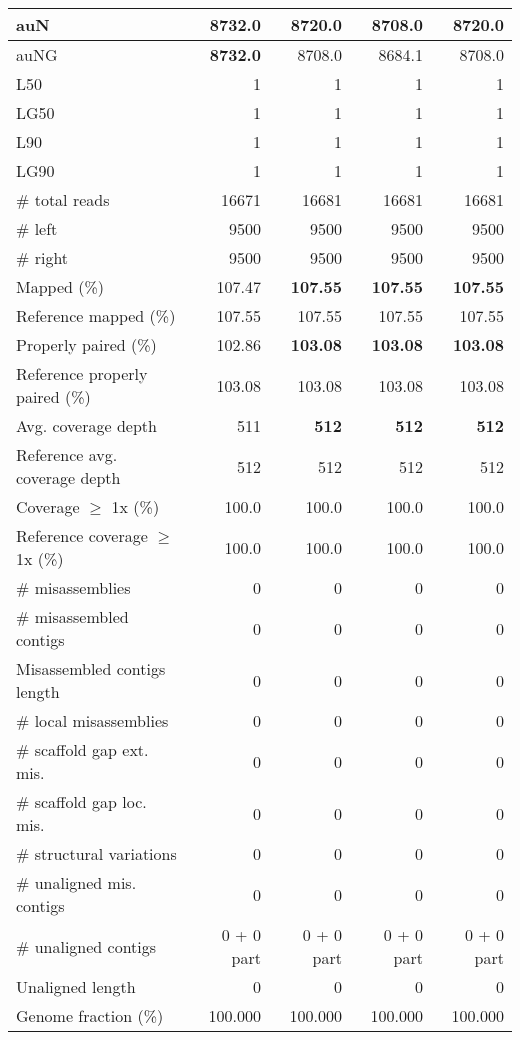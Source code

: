 \documentclass[12pt,a4paper]{article}
\begin{document}
\begin{table}[ht]
\begin{center}
\begin{tabular}{|l*{4}{|r}|}
auN & {\bf 8732.0} & 8720.0 & 8708.0 & 8720.0 \\ \hline
auNG & {\bf 8732.0} & 8708.0 & 8684.1 & 8708.0 \\ \hline
L50 & 1 & 1 & 1 & 1 \\ \hline
LG50 & 1 & 1 & 1 & 1 \\ \hline
L90 & 1 & 1 & 1 & 1 \\ \hline
LG90 & 1 & 1 & 1 & 1 \\ \hline
\# total reads & 16671 & 16681 & 16681 & 16681 \\ \hline
\# left & 9500 & 9500 & 9500 & 9500 \\ \hline
\# right & 9500 & 9500 & 9500 & 9500 \\ \hline
Mapped (\%) & 107.47 & {\bf 107.55} & {\bf 107.55} & {\bf 107.55} \\ \hline
Reference mapped (\%) & 107.55 & 107.55 & 107.55 & 107.55 \\ \hline
Properly paired (\%) & 102.86 & {\bf 103.08} & {\bf 103.08} & {\bf 103.08} \\ \hline
Reference properly paired (\%) & 103.08 & 103.08 & 103.08 & 103.08 \\ \hline
Avg. coverage depth & 511 & {\bf 512} & {\bf 512} & {\bf 512} \\ \hline
Reference avg. coverage depth & 512 & 512 & 512 & 512 \\ \hline
Coverage $\geq$ 1x (\%) & 100.0 & 100.0 & 100.0 & 100.0 \\ \hline
Reference coverage $\geq$ 1x (\%) & 100.0 & 100.0 & 100.0 & 100.0 \\ \hline
\# misassemblies & 0 & 0 & 0 & 0 \\ \hline
\# misassembled contigs & 0 & 0 & 0 & 0 \\ \hline
Misassembled contigs length & 0 & 0 & 0 & 0 \\ \hline
\# local misassemblies & 0 & 0 & 0 & 0 \\ \hline
\# scaffold gap ext. mis. & 0 & 0 & 0 & 0 \\ \hline
\# scaffold gap loc. mis. & 0 & 0 & 0 & 0 \\ \hline
\# structural variations & 0 & 0 & 0 & 0 \\ \hline
\# unaligned mis. contigs & 0 & 0 & 0 & 0 \\ \hline
\# unaligned contigs & 0 + 0 part & 0 + 0 part & 0 + 0 part & 0 + 0 part \\ \hline
Unaligned length & 0 & 0 & 0 & 0 \\ \hline
Genome fraction (\%) & 100.000 & 100.000 & 100.000 & 100.000 \\ \hline

\end{tabular}
\end{center}
\end{table}
\end{document}
